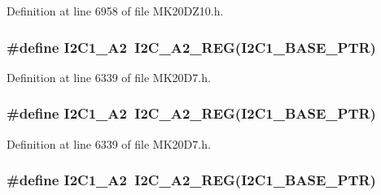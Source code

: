 Definition at line 6958 of file M\+K20\+D\+Z10.\+h.

\subsubsection[{\texorpdfstring{I2\+C1\+\_\+\+A2}{I2C1_A2}}]{\setlength{\rightskip}{0pt plus 5cm}\#define I2\+C1\+\_\+\+A2~{\bf I2\+C\+\_\+\+A2\+\_\+\+R\+EG}({\bf I2\+C1\+\_\+\+B\+A\+S\+E\+\_\+\+P\+TR})}\hypertarget{group___i2_c___register___accessor___macros_gaa4539c51795162a3fccf19384acf78f0}{}\label{group___i2_c___register___accessor___macros_gaa4539c51795162a3fccf19384acf78f0}


Definition at line 6339 of file M\+K20\+D7.\+h.

\subsubsection[{\texorpdfstring{I2\+C1\+\_\+\+A2}{I2C1_A2}}]{\setlength{\rightskip}{0pt plus 5cm}\#define I2\+C1\+\_\+\+A2~{\bf I2\+C\+\_\+\+A2\+\_\+\+R\+EG}({\bf I2\+C1\+\_\+\+B\+A\+S\+E\+\_\+\+P\+TR})}\hypertarget{group___i2_c___register___accessor___macros_gaa4539c51795162a3fccf19384acf78f0}{}\label{group___i2_c___register___accessor___macros_gaa4539c51795162a3fccf19384acf78f0}


Definition at line 6339 of file M\+K20\+D7.\+h.

\subsubsection[{\texorpdfstring{I2\+C1\+\_\+\+A2}{I2C1_A2}}]{\setlength{\rightskip}{0pt plus 5cm}\#define I2\+C1\+\_\+\+A2~{\bf I2\+C\+\_\+\+A2\+\_\+\+R\+EG}({\bf I2\+C1\+\_\+\+B\+A\+S\+E\+\_\+\+P\+TR})}\hypertarget{group___i2_c___register___accessor___macros_gaa4539c51795162a3fccf19384acf78f0}{}\label{group___i2_c___register___accessor___macros_gaa4539c51795162a3fccf19384acf78f0}


